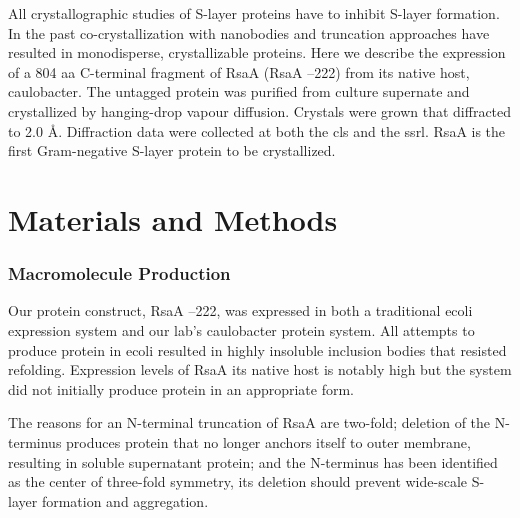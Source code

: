 All crystallographic studies of \ac{S-layer} proteins have to inhibit \ac{S-layer} formation. In the
past co-crystallization with nanobodies %
 and truncation %
 approaches have resulted in monodisperse, crystallizable proteins. Here we describe the
expression of a 804 \ac{aa} C-terminal fragment of RsaA (RsaA --222) from
its native host, \ac{caulobacter}. The untagged protein was purified
from culture supernate and crystallized by hanging-drop vapour
diffusion. Crystals were grown that diffracted to 2.0 \AA.
Diffraction data were collected at both the \ac{cls} 
and the \ac{ssrl}. RsaA is the first Gram-negative S-layer protein to be crystallized.

\section{Materials and Methods}
\label{sec:crystal-materials-and-methods}

\subsubsection{Macromolecule Production}
\label{sub:crystal-macromolecule-production}

Our protein construct, RsaA --222, was expressed in both a traditional
\ac{ecoli} expression system and our lab's \ac{caulobacter}
protein system. %
 All attempts to produce protein in \ac{ecoli}
resulted in highly insoluble inclusion bodies that resisted
refolding. Expression levels of RsaA its native host is notably high but
the system did not initially produce protein in an appropriate form.

The reasons for an N-terminal truncation of RsaA are two-fold; deletion
of the N-terminus produces protein that no longer anchors itself to
outer membrane, resulting in soluble supernatant protein; and the
N-terminus has been identified as the center of three-fold symmetry, its
deletion should prevent wide-scale \ac{S-layer} formation and aggregation.

